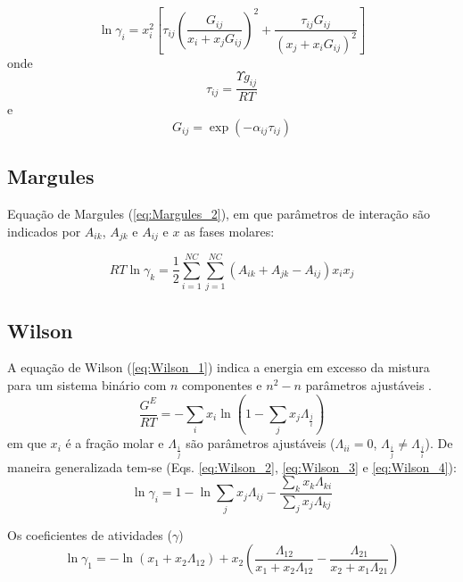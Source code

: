 	\begin{equation}\label{eq:nrtl_1}
	\ln\gamma_{i}=x_{i}^{2}\left[\tau_{ij} \left(\frac{G_{ij}}{x_{i}+x_{j}G_{ij}}\right)^{2}+\frac{\tau_{ij}G_{ij}}{(x_j+x_iG_{ij})^2}\right]
	\end{equation}
	onde
	\begin{equation}\label{eq:nrtl_2}
	\tau_{ij}=\frac{\Upsilon g_{ij}}{RT}
	\end{equation}
	e
	\begin{equation}\label{eq:nrtl_3}
	G_{ij}=\exp(-\alpha_{ij}\tau_{ij})
	\end{equation}
	
	\subsection{Margules}
	
	Equação de Margules (\ref{eq:Margules_2}), em que parâmetros de interação são indicados por $A_{ik}$, $A_{jk}$ e $A_{ij}$ e $x$ as fases molares:
	
\begin{equation}\label{eq:Margules_2}
	RT\ln\gamma_{k}=\frac{1}{2}\sum_{i=1}^{NC} \sum_{j=1}^{NC}(A_{ik}+A_{jk}-A_{ij})x_{i}x_{j}
\end{equation}
	
	\subsection{Wilson}
	
	A equação de Wilson (\ref{eq:Wilson_1}) indica a energia em excesso da mistura para um sistema binário com $n$ componentes e $n^{2}-n$ parâmetros ajustáveis \cite{Rocha2011}.
	\begin{equation}\label{eq:Wilson_1}
	\frac{G^{E}}{RT}=-\sum_{i}x_{i}\ln\left(1-\sum_{j}x_{j}\Lambda_{\frac{j}{i}}\right)
	\end{equation}
	em que $x_{i}$ é a fração molar e $\Lambda_{\frac{i}{j}}$ são parâmetros ajustáveis ($\Lambda_{ii}=0$, $\Lambda_{\frac{i}{j}}\neq\Lambda_{\frac{j}{i}}$). De maneira generalizada tem-se (Eqs. \ref{eq:Wilson_2}, \ref{eq:Wilson_3} e \ref{eq:Wilson_4}):
	\begin{equation}\label{eq:Wilson_2}
	\ln\gamma_{i}=1-\ln\sum_{j}x_{j}\Lambda_{ij}-\frac{\displaystyle\sum_{k}x_{k}\Lambda_{ki}} {\displaystyle\sum_{j}x_{j}\Lambda_{kj}}
	\end{equation}
	
	Os coeficientes de atividades ($\gamma$)
	\begin{equation}\label{eq:Wilson_3}
	\ln \gamma_{1}=-\ln(x_1+x_2\Lambda_{12} )+x_{2}\left(\frac{\Lambda_{12}}{x_1+x_2\Lambda_{12}}-\frac{\Lambda_{21}}{x_2+x_1\Lambda_{21}}\right)
	\end{equation}
	
